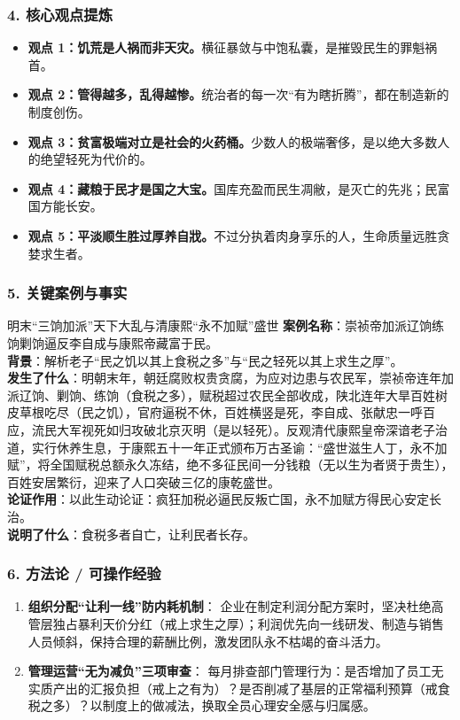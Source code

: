 \subsubsection{4. 核心观点提炼}
\begin{itemize}
    \item \textbf{观点 1：饥荒是人祸而非天灾。}横征暴敛与中饱私囊，是摧毁民生的罪魁祸首。
    \item \textbf{观点 2：管得越多，乱得越惨。}统治者的每一次“有为瞎折腾”，都在制造新的制度创伤。
    \item \textbf{观点 3：贫富极端对立是社会的火药桶。}少数人的极端奢侈，是以绝大多数人的绝望轻死为代价的。
    \item \textbf{观点 4：藏粮于民才是国之大宝。}国库充盈而民生凋敝，是灭亡的先兆；民富国方能长安。
    \item \textbf{观点 5：平淡顺生胜过厚养自戕。}不过分执着肉身享乐的人，生命质量远胜贪婪求生者。
\end{itemize}

\subsubsection{5. 关键案例与事实}
\begin{CaseBox}{明末“三饷加派”天下大乱与清康熙“永不加赋”盛世}
\textbf{案例名称}：崇祯帝加派辽饷练饷剿饷逼反李自成与康熙帝藏富于民。\\
\textbf{背景}：解析老子“民之饥以其上食税之多”与“民之轻死以其上求生之厚”。\\
\textbf{发生了什么}：明朝末年，朝廷腐败权贵贪腐，为应对边患与农民军，崇祯帝连年加派辽饷、剿饷、练饷（食税之多），赋税超过农民全部收成，陕北连年大旱百姓树皮草根吃尽（民之饥），官府逼税不休，百姓横竖是死，李自成、张献忠一呼百应，流民大军视死如归攻破北京灭明（是以轻死）。反观清代康熙皇帝深谙老子治道，实行休养生息，于康熙五十一年正式颁布万古圣谕：“盛世滋生人丁，永不加赋”，将全国赋税总额永久冻结，绝不多征民间一分钱粮（无以生为者贤于贵生），百姓安居繁衍，迎来了人口突破三亿的康乾盛世。\\
\textbf{论证作用}：以此生动论证：疯狂加税必逼民反叛亡国，永不加赋方得民心安定长治。\\
\textbf{说明了什么}：食税多者自亡，让利民者长存。
\end{CaseBox}

\subsubsection{6. 方法论 / 可操作经验}
\begin{enumerate}
    \item \textbf{组织分配“让利一线”防内耗机制}：
    企业在制定利润分配方案时，坚决杜绝高管层独占暴利天价分红（戒上求生之厚）；利润优先向一线研发、制造与销售人员倾斜，保持合理的薪酬比例，激发团队永不枯竭的奋斗活力。
    \item \textbf{管理运营“无为减负”三项审查}：
    每月排查部门管理行为：是否增加了员工无实质产出的汇报负担（戒上之有为）？是否削减了基层的正常福利预算（戒食税之多）？以制度上的做减法，换取全员心理安全感与归属感。
\end{enumerate}

